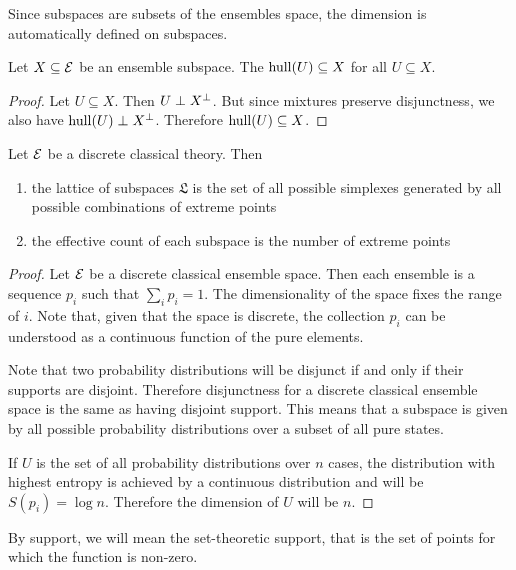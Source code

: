 \begin{remark}
	Since subspaces are subsets of the ensembles space, the dimension is automatically defined on subspaces.
\end{remark}

\begin{prop}\label{pm_es_subspacesContainHulls}
	Let $X \subseteq \mathcal{E}$ be an ensemble subspace. The $\mathrm{hull}(U) \subseteq X$ for all $U \subseteq X$.
\end{prop}

\begin{proof}
	Let $U \subseteq X$. Then $U \perp X^{\perp}$. But since mixtures preserve disjunctness, we also have $\mathrm{hull}(U) \perp X^{\perp}$. Therefore $\mathrm{hull}(U) \subseteq X$.
\end{proof}

\begin{prop}
	Let $\mathcal{E}$ be a discrete classical theory. Then
	\begin{enumerate}
		\item the lattice of subspaces $\mathfrak{L}$ is the set of all possible simplexes generated by all possible combinations of extreme points
		\item the effective count of each subspace is the number of extreme points
	\end{enumerate}
\end{prop}

\begin{proof}
	Let $\mathcal{E}$ be a discrete classical ensemble space. Then each ensemble is a sequence $p_i$ such that $\sum_i p_i = 1$. The dimensionality of the space fixes the range of $i$. Note that, given that the space is discrete, the collection $p_i$ can be understood as a continuous function of the pure elements.
	
	Note that two probability distributions will be disjunct if and only if their supports are disjoint. Therefore disjunctness for a discrete classical ensemble space is the same as having disjoint support. This means that a subspace is given by all possible probability distributions over a subset of all pure states.
	
	If $U$ is the set of all probability distributions over $n$ cases, the distribution with highest entropy is achieved by a continuous distribution and will be $S(p_i) = \log n$. Therefore the dimension of $U$ will be $n$.
\end{proof}

\begin{remark}
	By support, we will mean the set-theoretic support, that is the set of points for which the function is non-zero.
\end{remark}


